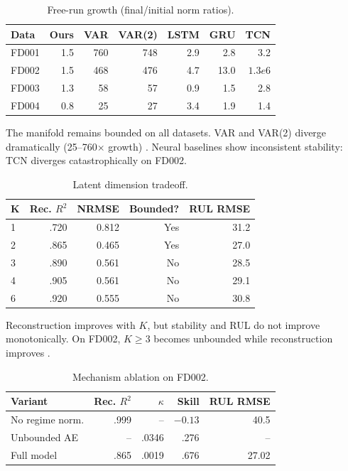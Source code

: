 \documentclass[letterpaper]{article}
\begin{document}
\begin{table}[t]
\small
\centering
\caption{Free-run growth (final/initial norm ratios).}
\begin{tabular}{lrrrrrr}
\toprule
Data & Ours & VAR & VAR(2) & LSTM & GRU & TCN \\
\midrule
FD001 & 1.5 & 760 & 748 & 2.9 & 2.8 & 3.2 \\
FD002 & 1.5 & 468 & 476 & 4.7 & 13.0 & $1.3e6$ \\
FD003 & 1.3 & 58 & 57 & 0.9 & 1.5 & 2.8 \\
FD004 & 0.8 & 25 & 27 & 3.4 & 1.9 & 1.4 \\
\bottomrule
\end{tabular}
\end{table}

The manifold remains bounded on all datasets. VAR and VAR(2) diverge dramatically (25--760$\times$ growth) \cite{torres2021deep}. Neural baselines show inconsistent stability: TCN diverges catastrophically on FD002.

\begin{table}[t]
\small
\centering
\caption{Latent dimension tradeoff.}
\begin{tabular}{lrrrr}
\toprule
K & Rec. $R^2$ & NRMSE & Bounded? & RUL RMSE \\
\midrule
1 & .720 & 0.812 & Yes & 31.2 \\
2 & .865 & 0.465 & Yes & 27.0 \\
3 & .890 & 0.561 & No & 28.5 \\
4 & .905 & 0.561 & No & 29.1 \\
6 & .920 & 0.555 & No & 30.8 \\
\bottomrule
\end{tabular}
\end{table}

Reconstruction improves with $K$, but stability and RUL do not improve monotonically. On FD002, $K \geq 3$ becomes unbounded while reconstruction improves \cite{erichson2020forecasting}.

\begin{table}[t]
\small
\centering
\caption{Mechanism ablation on FD002.}
\begin{tabular}{lrrrr}
\toprule
Variant & Rec. $R^2$ & $\kappa$ & Skill & RUL RMSE \\
\midrule
No regime norm. & .999 & -- & $-0.13$ & 40.5 \\
Unbounded AE & -- & .0346 & .276 & -- \\
Full model & .865 & .0019 & .676 & 27.02 \\
\bottomrule
\end{tabular}
\end{table}
\end{document}

